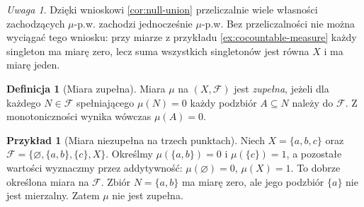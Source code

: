 \documentclass[11pt,a4paper,oneside]{book}
\numberwithin{equation}{chapter}
\theoremstyle{plain}
\theoremstyle{definition}
\newtheorem{definicja}[twierdzenie]{Definicja}
\newtheorem{przyklad}[twierdzenie]{Przykład}
\theoremstyle{remark}
\newtheorem{uwaga}[twierdzenie]{Uwaga}
\begin{document}
\begin{uwaga}
Dzięki wnioskowi \ref{cor:null-union} przeliczalnie wiele
własności zachodzących $\mu$-p.w. zachodzi jednocześnie
$\mu$-p.w. Bez przeliczalności nie można wyciągać tego
wniosku: przy miarze z przykładu \ref{ex:cocountable-measure}
każdy singleton ma miarę zero, lecz suma wszystkich singletonów
jest równa $X$ i ma miarę jeden.
\end{uwaga}

\begin{definicja}[Miara zupełna]
\label{def:complete-measure}
Miara $\mu$ na $(X,\mathcal F)$ jest \emph{zupełna}, jeżeli
dla każdego $N\in\mathcal F$ spełniającego $\mu(N)=0$
każdy podzbiór $A\subseteq N$ należy do $\mathcal F$.
Z monotoniczności wynika wówczas $\mu(A)=0$.
\end{definicja}

\begin{przyklad}[Miara niezupełna na trzech punktach]
\label{ex:incomplete-measure}
Niech $X=\{a,b,c\}$ oraz
$\mathcal F=\{\varnothing,\{a,b\},\{c\},X\}$.
Określmy $\mu(\{a,b\})=0$ i $\mu(\{c\})=1$,
a pozostałe wartości wyznaczmy przez addytywność:
$\mu(\varnothing)=0$, $\mu(X)=1$.
To dobrze określona miara na $\mathcal F$.
Zbiór $N=\{a,b\}$ ma miarę zero, ale jego podzbiór
$\{a\}$ nie jest mierzalny. Zatem $\mu$ nie jest zupełna.
\end{przyklad}
\end{document}
